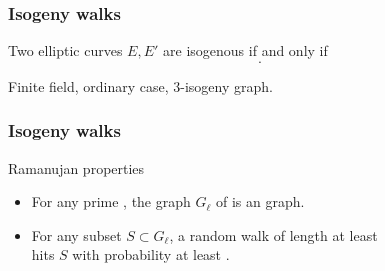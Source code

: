 \documentclass{beamer}
\renewcommand{\emph}[1]{}
\begin{document}

\begin{frame}
  \frametitle{Isogeny walks}

  \begin{theorem}
    Two elliptic curves $E,E'$ are isogenous if and only if
    \[\emph{\Q\otimes\End(E) \simeq \Q\otimes\End(E')}.\]
  \end{theorem}

  \emph{Example:} Finite field, ordinary case, $3$-isogeny graph.

  \begin{center}
  \end{center}
\end{frame}







\begin{frame}
  \frametitle{Isogeny walks}

  \begin{block}{Ramanujan properties}
    \begin{itemize}
    \item For any prime \emph{$\ell$}, the graph $G_\ell$ of
      \emph{$\ell$-isogenies} is an \emph{$\ell+1$-regular} graph.
    \item For any subset $S\subset G_\ell$, a random walk of length at
      least \[\emph{\sim\frac{2|G_\ell|}{\sqrt{|S|}}}\] hits $S$ with
      probability at least \emph{$|S|/2|G|$}.
    \end{itemize}
  \end{block}
\end{frame}
\end{document}
